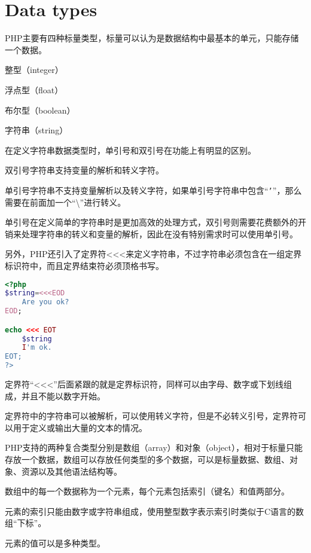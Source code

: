 \chapter{Data types}

PHP主要有四种标量类型，标量可以认为是数据结构中最基本的单元，只能存储一个数据。

\begin{compactitem}
\item 整型（integer）
\item 浮点型（float）
\item 布尔型（boolean）
\item 字符串（string）
\end{compactitem}

在定义字符串数据类型时，单引号和双引号在功能上有明显的区别。

\begin{compactitem}
\item 双引号字符串支持变量的解析和转义字符。
\item 单引号字符串不支持变量解析以及转义字符，如果单引号字符串中包含“\texttt{'}”，那么需要在前面加一个“\textbackslash ”进行转义。
\end{compactitem}

单引号在定义简单的字符串时是更加高效的处理方式，双引号则需要花费额外的开销来处理字符串的转义和变量的解析，因此在没有特别需求时可以使用单引号。

另外，PHP还引入了定界符<\/<\/<来定义字符串，不过字符串必须包含在一组定界标识符中，而且定界结束符必须顶格书写。

\begin{lstlisting}[language=PHP]
<?php
$string=<<<EOD
	Are you ok?
EOD;

echo <<< EOT
	$string
	I'm ok.
EOT;
?>
\end{lstlisting}

定界符“<\/<\/<”后面紧跟的就是定界标识符，同样可以由字母、数字或下划线组成，并且不能以数字开始。

定界符中的字符串可以被解析，可以使用转义字符，但是不必转义引号，定界符可以用于定义或输出大量的文本的情况。

PHP支持的两种复合类型分别是数组（array）和对象（object），相对于标量只能存放一个数据，数组可以存放任何类型的多个数据，可以是标量数据、数组、对象、资源以及其他语法结构等。

数组中的每一个数据称为一个元素，每个元素包括索引（键名）和值两部分。

\begin{compactitem}
\item 元素的索引只能由数字或字符串组成，使用整型数字表示索引时类似于C语言的数组“下标”。
\item 元素的值可以是多种类型。
\end{compactitem}

